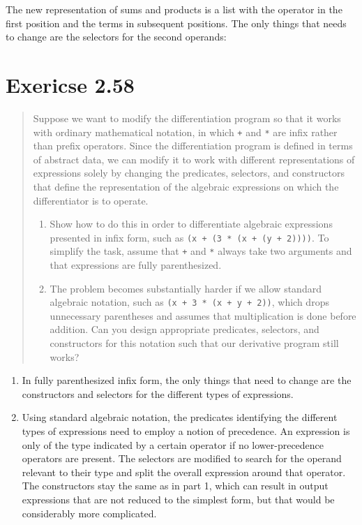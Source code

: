 \documentclass{article}
\begin{document}
The new representation of sums and products is a list with the operator in the
first position and the terms in subsequent positions. The only things that needs
to change are the selectors for the second operands:


\section{Exericse 2.58}
\begin{quote}
    Suppose we want to modify the differentiation program so that it works with
    ordinary mathematical notation, in which \texttt{+} and \texttt{*} are
    infix rather than prefix operators. Since the differentiation program is
    defined in terms of abstract data, we can modify it to work with different
    representations of expressions solely by changing the predicates,
    selectors, and constructors that define the representation of the algebraic
    expressions on which the differentiator is to operate.
    \begin{enumerate}
        \item Show how to do this in order to differentiate algebraic
            expressions presented in infix form, such as \texttt{(x + (3 * (x +
            (y + 2))))}. To simplify the task, assume that \texttt{+} and
            \texttt{*} always take two arguments and that expressions are fully
            parenthesized.
        \item The problem becomes substantially harder if we allow standard
            algebraic notation, such as \texttt{(x + 3 * (x + y + 2))}, which
            drops unnecessary parentheses and assumes that multiplication is
            done before addition. Can you design appropriate predicates,
            selectors, and constructors for this notation such that our
            derivative program still works?
    \end{enumerate}
\end{quote}

\begin{enumerate}
    \item In fully parenthesized infix form, the only things that need to
        change are the constructors and selectors for the different types of
        expressions.
        
    \item Using standard algebraic notation, the predicates identifying the
        different types of expressions need to employ a notion of precedence.
        An expression is only of the type indicated by a certain operator if no
        lower-precedence operators are present. The selectors are modified to
        search for the operand relevant to their type and split the overall
        expression around that operator. The constructors stay the same as in
        part 1, which can result in output expressions that are not reduced to
        the simplest form, but that would be considerably more complicated.
        
\end{enumerate}
\end{document}
